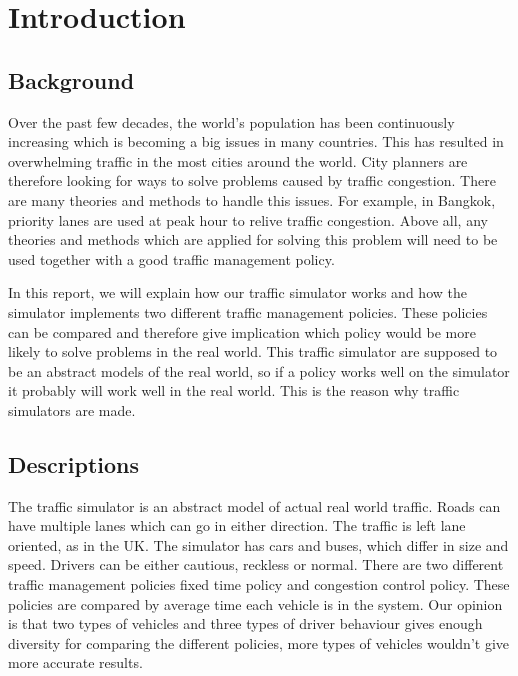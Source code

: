 \documentclass[11pt]{article}
\begin{document}
\newpage

\section{Introduction}
\subsection{Background}
Over the past few decades, the world’s population has been continuously increasing which is becoming a big issues in many countries. This has resulted in overwhelming traffic in the most cities around the world. City planners are therefore looking for ways to solve problems caused by traffic congestion. There are many theories and methods to handle this issues. For example, in Bangkok, priority lanes are used at peak hour to relive traffic congestion.  Above all, any theories and methods which are applied for solving this problem will need to be used together with a good traffic management policy.

In this report, we will explain how our traffic simulator works and how the simulator implements two different traffic management policies. These policies can be compared and therefore give implication which policy would be more likely to solve problems in the real world. This traffic simulator are supposed to be an abstract models of the real world, so if a policy works well on the simulator it probably will work well in the real world. This is the reason why traffic simulators are made. 
	
\subsection{Descriptions}
The traffic simulator is an abstract model of actual real world traffic. Roads can have multiple lanes which can go in either direction. The traffic is left lane oriented, as in the UK. The simulator has cars and buses, which differ in size and speed. Drivers can be either cautious, reckless or normal. There are two different traffic management policies fixed time policy and congestion control policy. These policies are compared by average time each vehicle is in the system. Our opinion is that two types of vehicles and three types of driver behaviour gives enough diversity for comparing the different policies, more types of vehicles wouldn't give more accurate results.
\end{document}
